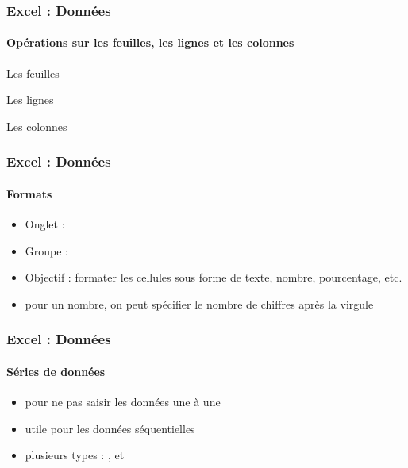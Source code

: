 \documentclass[xcolor=table, usenames,dvipsnames]{beamer}
\begin{document}
\begin{frame}
\frametitle{Excel : Données}
\framesubtitle{Opérations sur les feuilles, les lignes et les colonnes}

\begin{minipage}{0.40\textwidth}
	Les feuilles
	
\end{minipage}
\begin{minipage}{0.28\textwidth}
	Les lignes
	
\end{minipage}
\begin{minipage}{0.25\textwidth}
	Les colonnes
	
\end{minipage}

\end{frame}

\begin{frame}[t]
\frametitle{Excel : Données}
\framesubtitle{Formats}

\begin{minipage}{0.5\textwidth}
	\begin{itemize}
		\item Onglet : 
		\item Groupe : 
		\item Objectif : formater les cellules sous forme de texte, nombre, pourcentage, etc.
		\item pour un nombre, on peut spécifier le nombre de chiffres après la virgule
	\end{itemize}
\end{minipage}
%
\begin{minipage}{0.49\textwidth}
\end{minipage}

\end{frame}

\begin{frame}
\frametitle{Excel : Données}
\framesubtitle{Séries de données}

\begin{minipage}{0.34\textwidth}
	\begin{itemize}
		\item pour ne pas saisir les données une à une
		\item utile pour les données séquentielles 
		\item plusieurs types : ,  et 
	\end{itemize}
\end{minipage}
%
\begin{minipage}{0.65\textwidth}
\end{minipage}


\end{frame}
\end{document}
